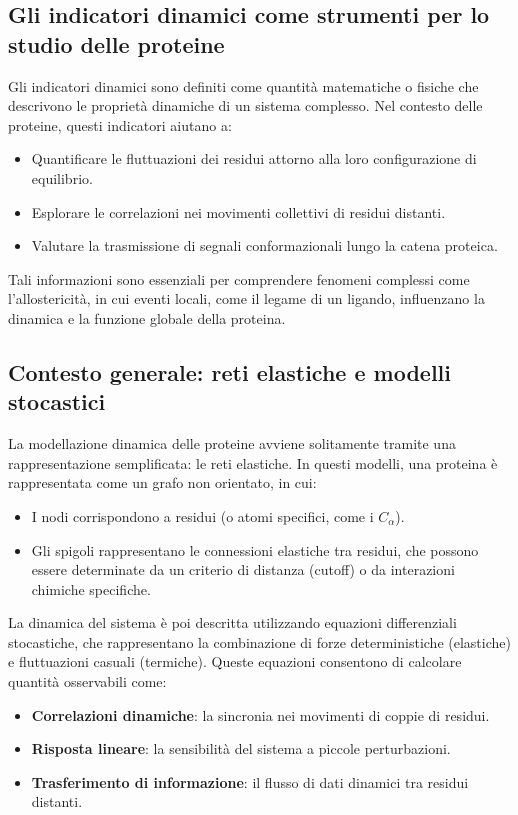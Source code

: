 \documentclass[Lau,binding=0.6cm,oneside,noexaminfo]{sapthesis}
\begin{document}
\subsection{Gli indicatori dinamici come strumenti per lo studio delle proteine}
Gli indicatori dinamici sono definiti come quantità matematiche o fisiche che descrivono le proprietà dinamiche di un sistema complesso. Nel contesto delle proteine, questi indicatori aiutano a:
\begin{itemize}
    \item Quantificare le fluttuazioni dei residui attorno alla loro configurazione di equilibrio.
    \item Esplorare le correlazioni nei movimenti collettivi di residui distanti.
    \item Valutare la trasmissione di segnali conformazionali lungo la catena proteica.
\end{itemize}
Tali informazioni sono essenziali per comprendere fenomeni complessi come l’allostericità, in cui eventi locali, come il legame di un ligando, influenzano la dinamica e la funzione globale della proteina.

\subsection{Contesto generale: reti elastiche e modelli stocastici}
La modellazione dinamica delle proteine avviene solitamente tramite una rappresentazione semplificata: le reti elastiche. In questi modelli, una proteina è rappresentata come un grafo non orientato, in cui:
\begin{itemize}
    \item I nodi corrispondono a residui (o atomi specifici, come i $C_\alpha$).
    \item Gli spigoli rappresentano le connessioni elastiche tra residui, che possono essere determinate da un criterio di distanza (cutoff) o da interazioni chimiche specifiche.
\end{itemize}

La dinamica del sistema è poi descritta utilizzando equazioni differenziali stocastiche, che rappresentano la combinazione di forze deterministiche (elastiche) e fluttuazioni casuali (termiche). Queste equazioni consentono di calcolare quantità osservabili come:
\begin{itemize}
    \item \textbf{Correlazioni dinamiche}: la sincronia nei movimenti di coppie di residui.
    \item \textbf{Risposta lineare}: la sensibilità del sistema a piccole perturbazioni.
    \item \textbf{Trasferimento di informazione}: il flusso di dati dinamici tra residui distanti.
\end{itemize}
\end{document}
